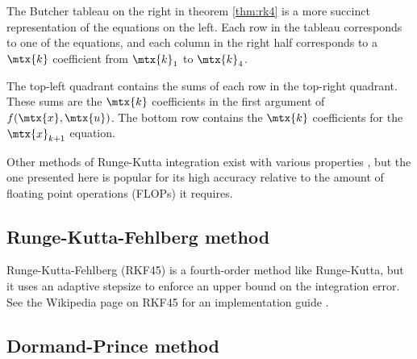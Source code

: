 The Butcher tableau on the right in theorem \ref{thm:rk4} is a more succinct
representation of the equations on the left. Each row in the tableau corresponds
to one of the equations, and each column in the right half corresponds to a
$\mtx{k}$ coefficient from $\mtx{k}_1$ to $\mtx{k}_4$.

The top-left quadrant contains the sums of each row in the top-right quadrant.
These sums are the $\mtx{k}$ coefficients in the first argument of
$f(\mtx{x}, \mtx{u})$. The bottom row contains the $\mtx{k}$ coefficients for
the $\mtx{x}_{k+1}$ equation.

Other methods of Runge-Kutta integration exist with various properties
\cite{bib:wiki_rk4}, but the one presented here is popular for its high accuracy
relative to the amount of floating point operations (FLOPs) it requires.

\subsection{Runge-Kutta-Fehlberg method}

Runge-Kutta-Fehlberg (RKF45) is a fourth-order method like Runge-Kutta, but it
uses an adaptive stepsize to enforce an upper bound on the integration error.
See the Wikipedia page on RKF45 for an implementation guide
\cite{bib:wiki_rkf45}.

\subsection{Dormand-Prince method}

